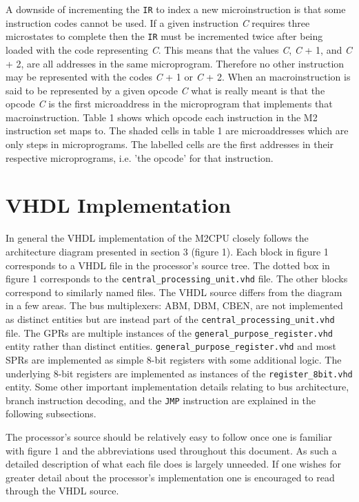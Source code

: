 \documentclass[a4paper,12pt]{article}
\newcommand{\mt}{M2CPU}
\newcommand{\mi}{M2 instruction set}
\newcommand{\IR}{\texttt{IR}}
\begin{document}
A downside of incrementing the \IR{} to index a new microinstruction is that 
some instruction codes cannot be used. If a given instruction \textit{C} 
requires three microstates to complete then the \IR{} must be incremented twice
after being loaded with the code representing \textit{C}. This means that the
values \textit{C}, \textit{C} + 1, and \textit{C} + 2, are all addresses in the
same microprogram. Therefore no other instruction may be represented with the
codes \textit{C} + 1 or \textit{C} + 2. When an macroinstruction is said to be
represented by a given opcode \textit{C} what is really meant is that the 
opcode \textit{C} is the first microaddress in the microprogram that implements
that macroinstruction. Table 1 shows which opcode each instruction in the \mi{}
maps to. The shaded cells in table 1 are microaddresses which are only steps
in microprograms. The labelled cells are the first addresses in their respective
microprograms, i.e. 'the opcode' for that instruction.
\par

\newpage
\section{VHDL Implementation}
In general the VHDL implementation of the \mt{} closely follows the 
architecture diagram presented in section 3 (figure 1). Each block in figure 1
corresponds to a VHDL file in the processor's source tree. The dotted box in 
figure 1 corresponds to the \texttt{central\_processing\_unit.vhd} file. The
other blocks correspond to similarly named files. The VHDL source differs from
the diagram in a few areas. The bus multiplexers: ABM, DBM, CBEN, are not 
implemented as distinct entities but are instead part of the 
\texttt{central\_processing\_unit.vhd} file. The GPRs are multiple instances
of the \texttt{general\_purpose\_register.vhd} entity rather than distinct
entities. \texttt{general\_purpose\_register.vhd} and most SPRs are implemented
as simple 8-bit registers with some additional logic. The underlying 8-bit 
registers are implemented as instances of the \texttt{register\_8bit.vhd} 
entity. Some other important implementation details relating to bus 
architecture, branch instruction decoding, and the \texttt{JMP} instruction are
explained in the following subsections.

The processor's source should be relatively easy to follow once one is familiar
with figure 1 and the abbreviations used throughout this document. As such a 
detailed description of what each file does is largely unneeded. If one
wishes for greater detail about the processor's implementation one is encouraged
to read through the VHDL source.
\par
\end{document}
